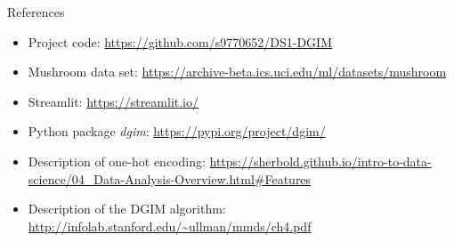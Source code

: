 \begin{frame}{References}
	\begin{itemize}
		\item
		Project code:
		\url{https://github.com/s9770652/DS1-DGIM}
		
		\item
		Mushroom data set:
		\url{https://archive-beta.ics.uci.edu/ml/datasets/mushroom}
		
		\item
		Streamlit:
		\url{https://streamlit.io/}
		
		\item
		Python package \emph{dgim}:
		\url{https://pypi.org/project/dgim/}
		
		\item
		Description of one-hot encoding:
		\url{https://sherbold.github.io/intro-to-data-science/04_Data-Analysis-Overview.html\#Features}
		
		\item
		Description of the DGIM algorithm:
		\url{http://infolab.stanford.edu/~ullman/mmds/ch4.pdf}
	\end{itemize}
\end{frame}